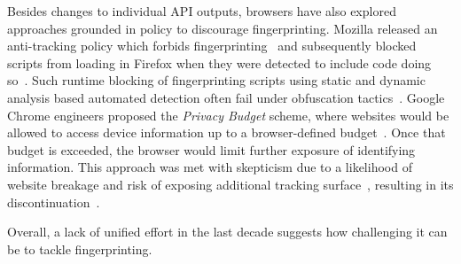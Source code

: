 Besides changes to individual API outputs, browsers have also explored approaches grounded in policy to discourage fingerprinting. 
%
Mozilla released an anti-tracking policy which forbids fingerprinting~\cite{mozillaSecurityTrackingPolicy2019} and subsequently blocked scripts from loading in Firefox when they were detected to include code doing so~\cite{englehardtFirefox72Blocks2020}. 
%
Such runtime blocking of fingerprinting scripts using static and dynamic analysis based automated detection often fail under obfuscation tactics~\cite{faizkhademi2015fpguard}.
% 
%
Google Chrome engineers proposed the \textit{Privacy Budget} scheme, where websites would be allowed to access device information up to a browser-defined budget~\cite{lasseyMikewestPrivacybudget2019}.
%
Once that budget is exceeded, the browser would limit further exposure of identifying information. 
%
This approach was met with skepticism due to a likelihood of website breakage and risk of exposing additional tracking surface~\cite{snyderBraveFingerprintingPrivacy2019, rescorlaTechnicalCommentsPrivacy2021}, resulting in its discontinuation~\cite{leflerWhatHappenedPrivacy2024}. 
%

Overall, a lack of unified effort in the last decade suggests how challenging it can be to tackle fingerprinting.

